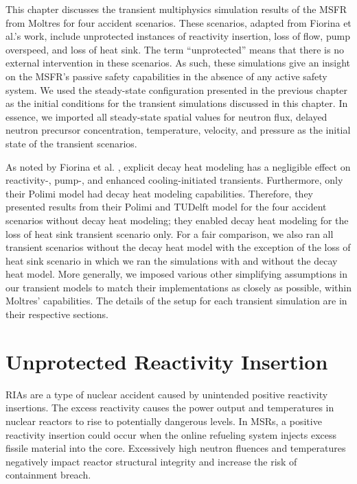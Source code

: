 This chapter discusses the transient multiphysics simulation results of the
\gls{MSFR} from Moltres for four accident scenarios. These scenarios, adapted
from Fiorina et al.'s work, include
unprotected instances of reactivity insertion, loss of flow, pump overspeed,
and loss of heat sink. The term ``unprotected'' means that there is no
external intervention in these scenarios. As such, these simulations
give an insight on the \gls{MSFR}'s passive safety capabilities in the absence
of any active safety system. We used the steady-state configuration presented
in the previous chapter as the initial conditions for the transient
simulations discussed in this chapter. In essence, we imported all
steady-state spatial values for neutron flux, delayed neutron precursor
concentration, temperature, velocity, and pressure as the initial state of the
transient scenarios.

As noted by Fiorina et al. \cite{fiorina_modelling_2014}, explicit decay heat
modeling has a negligible effect on reactivity-, pump-, and enhanced
cooling-initiated transients. Furthermore, only their Polimi model had decay
heat modeling capabilities. Therefore, they presented results from their
Polimi and TUDelft model for the four accident scenarios 
without decay heat modeling; they enabled decay heat modeling for the
loss of heat sink transient scenario only. For a fair comparison, we also ran
all transient scenarios without the decay heat model with the exception of the
loss of heat sink scenario in which we ran the simulations with and without
the decay heat model. More generally, we imposed various other simplifying
assumptions in our transient models to match their implementations as closely
as possible, within Moltres' capabilities. The details of the setup for each
transient simulation are in their respective sections.

\section{Unprotected Reactivity Insertion}

\glspl{RIA} are a type of nuclear accident caused by unintended positive
reactivity insertions. The excess reactivity causes the power output and
temperatures in nuclear reactors to rise to potentially dangerous levels. In
\glspl{MSR}, a positive reactivity insertion could occur when the online
refueling system injects excess fissile material into the core. Excessively
high neutron fluences and temperatures negatively impact reactor structural
integrity and increase the risk of containment breach.

